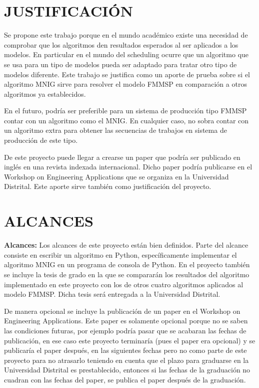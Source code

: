 \documentclass{article}
\begin{document}
\section{JUSTIFICACIÓN}

Se propone este trabajo porque en el mundo académico existe una necesidad de
comprobar que los algoritmos den resultados esperados al ser aplicados a los
modelos. En particular en el mundo
del scheduling ocurre que un algoritmo que se usa para un tipo de modelos pueda
ser adaptado para tratar otro tipo de modelos diferente. Este trabajo se
justifica como un aporte de prueba sobre si el algoritmo MNIG sirve para
resolver el modelo FMMSP en comparación a otros algoritmos ya establecidos.

\vspace{\baselineskip}
En el futuro, podría ser preferible para un sistema de producción tipo
\linebreak FMMSP
contar con un algoritmo como el MNIG. En cualquier caso, no sobra contar con
un algoritmo extra para obtener las secuencias de trabajos en sistema de
producción de este tipo.

\vspace{\baselineskip}
De este proyecto puede llegar a crearse un paper que podría ser publicado
en inglés en una revista indexada internacional. Dicho paper podría 
publicarse en el Workshop on Engineering Applications que se organiza en
la Universidad Distrital. Este aporte sirve también como justificación del 
proyecto.

\section{ALCANCES}

\textbf{Alcances:} Los alcances de este proyecto están bien definidos. Parte 
del alcance consiste en escribir un algoritmo en Python, específicamente
implementar el algoritmo MNIG en un programa de consola de Python. En el 
proyecto también se incluye la tesis de grado en la que se compararán
los resultados del algoritmo implementado en este proyecto con los de otros
cuatro algoritmos aplicados al modelo FMMSP. Dicha tesis será entregada a la
Universidad Distrital.

\vspace{\baselineskip}
De manera opcional se incluye la publicación de un paper en el Workshop on
Engineering Applications. Este paper es solamente opcional porque no se saben
las condiciones futuras, por ejemplo podría pasar que se acabaran las fechas
de publicación, en ese caso este proyecto terminaría (pues el paper era 
opcional) y se publicaría el paper después, en las siguientes fechas pero no
como parte de este proyecto para no atrasarlo teniendo en cuenta que el plazo
para graduarse en la Universidad Distrital es prestablecido, entonces si las
fechas de la graduación no cuadran con las fechas del paper, se publica el 
paper después de la graduación.
\end{document}
